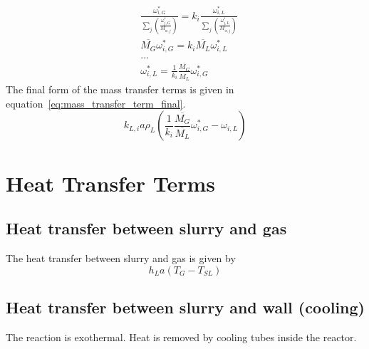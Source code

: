 \documentclass{article}
\begin{document}
\begin{equation}
	\begin{split}
		&\frac{\omega_{i,G}^*}{\sum_j \left( \frac{\omega_{j,G}^*}{M_{w,j}}\right)} = k_i\frac{\omega_{i,L}^*}{\sum_j \left( \frac{\omega_{j,L}^*}{M_{w,j}}\right)} \\
		&\overline{M_G}\omega_{i,G}^* = k_i \overline{M_L}\omega_{i,L}^*\\
		&...\\
		&\omega_{i,L}^* = \frac{1}{k_i}\frac{\overline{M_G}}{\overline{M_L}}\omega_{i,G}^* 
	\label{eq:GL_equilibrium_criterium_average_molar_mass_inserted}
	\end{split}
\end{equation}
The final form of the mass transfer terms is given in equation~\ref{eq:mass_transfer_term_final}.
\begin{equation}
	k_{L,i}a\rho_L(\frac{1}{k_i}\frac{\overline{M_G}}{\overline{M_L}}\omega_{i,G}^*-\omega_{i,L})
	\label{eq:mass_transfer_term_final}
\end{equation}

\section{Heat Transfer Terms}

\subsection{Heat transfer between slurry and gas}
The heat transfer between slurry and gas is given by
\begin{equation}
	h_L a (T_G - T_{SL})
\end{equation}

\subsection{Heat transfer between slurry and wall (cooling)}
The reaction is exothermal. Heat is removed by cooling tubes inside the reactor.
\end{document}
